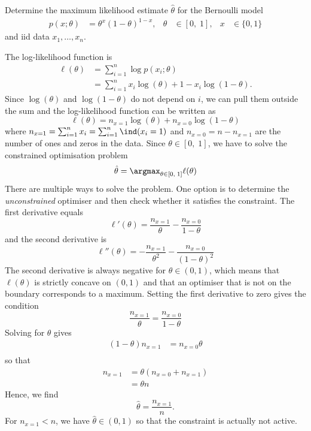 \begin{exenumerate}
\item \label{q:mle-bernoulli} Determine the maximum likelihood estimate $\hat{\theta}$ for the
  Bernoulli model
  \begin{align}
    p(x; \theta) &= \theta^{x} (1-\theta)^{1-x},& \theta &\in [0,\;1],&  x &\in\{0,1\} 
  \end{align}
  and iid data $x_1, \ldots, x_n$.
  \begin{solution}
   The log-likelihood function is
  \begin{align}      
    \ell(\theta) & = \sum_{i=1}^n \log p(x_i; \theta) \\
    & = \sum_{i=1}^n x_i \log(\theta) + 1-x_i \log(1-\theta).
  \end{align}
  Since $\log(\theta)$ and $\log(1-\theta)$ do not depend on $i$, we
  can pull them outside the sum and the log-likelihood function can be
  written as
  \begin{equation}
    \ell(\theta) = n_{x=1} \log (\theta) + n_{x=0} \log(1-\theta)
  \end{equation}
  where $n_{x=1} = \sum_{i=1}^n x_i = \sum_{i=1}^n \ind(x_i=1)$ and
  $n_{x=0} = n-n_{x=1}$ are the number of ones and zeros in the
  data. Since $\theta \in [0,\;1]$, we have to solve the constrained
  optimisation problem
  \begin{equation}
    \hat{\theta} = \argmax_{\theta \in [0,\;1]}   \ell(\theta)
  \end{equation}
  There are multiple ways to solve the problem. One option is to
  determine the \emph{unconstrained} optimiser and then check whether
  it satisfies the constraint. The first derivative equals
  \begin{equation}
    \ell'(\theta) = \frac{n_{x=1}}{\theta} - \frac{n_{x=0}}{1-\theta}
  \end{equation}
  and the second derivative is
  \begin{equation}
    \ell''(\theta) = -\frac{n_{x=1}}{\theta^2} - \frac{n_{x=0}}{(1-\theta)^2}
  \end{equation}
  The second derivative is always negative for $\theta \in (0,1)$,
  which means that $\ell(\theta)$ is strictly concave on $(0,1)$
  and that an optimiser that is not on the boundary corresponds to a
  maximum. Setting the first derivative to zero gives the condition
  \begin{equation}
   \frac{n_{x=1}}{\theta} = \frac{n_{x=0}}{1-\theta}
  \end{equation}
  Solving for $\theta$ gives
  \begin{align}
    (1-\theta) n_{x=1} &= n_{x=0} \theta\\
  \end{align}
  so that
  \begin{align}
    n_{x=1} & = \theta( n_{x=0}+ n_{x=1})\\
    & = \theta n
  \end{align}
  Hence, we find
  \begin{equation}
    \hat{\theta} = \frac{n_{x=1}}{n}.
  \end{equation}
  For $n_{x=1}< n$, we have $\hat{\theta} \in (0,1)$ so that the
  constraint is actually not active.
  

\end{solution}
\end{exenumerate}
